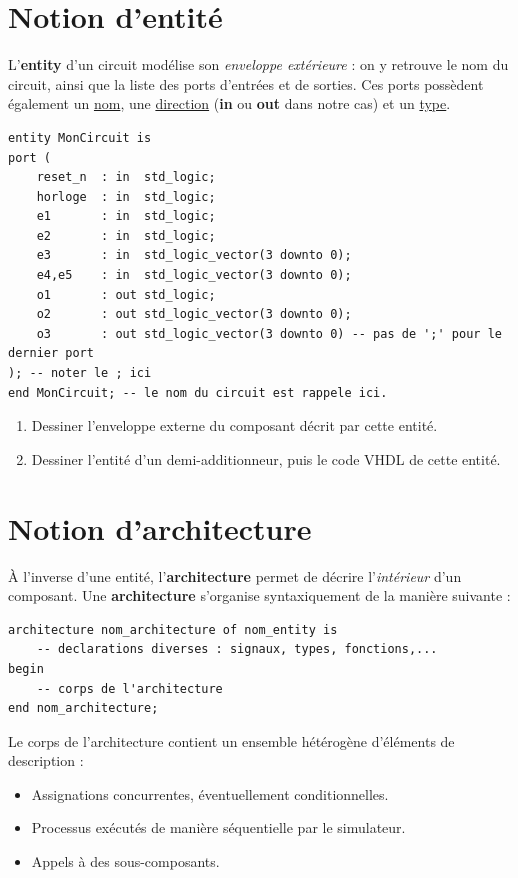 \documentclass[a4paper,11pt]{article}
\begin{document}
\section{Notion d'entité}

L'\textbf{entity} d'un circuit modélise son \textit{enveloppe extérieure} : on y retrouve le nom du circuit, ainsi que la liste des ports d'entrées et de sorties. Ces ports possèdent également un \underline{nom}, une \underline{direction} (\textbf{in} ou \textbf{out} dans notre cas) et un \underline{type}.

\begin{lstlisting}[style=vhdlstyle]
entity MonCircuit is
port (
    reset_n  : in  std_logic;
    horloge  : in  std_logic;
    e1       : in  std_logic;
    e2       : in  std_logic;
    e3       : in  std_logic_vector(3 downto 0);
    e4,e5    : in  std_logic_vector(3 downto 0);
    o1       : out std_logic;
    o2       : out std_logic_vector(3 downto 0);
    o3       : out std_logic_vector(3 downto 0) -- pas de ';' pour le dernier port
); -- noter le ; ici
end MonCircuit; -- le nom du circuit est rappele ici.
\end{lstlisting}

\begin{questionbox}
\begin{enumerate}
    \item Dessiner l'enveloppe externe du composant décrit par cette entité.
    \item Dessiner l'entité d'un demi-additionneur, puis le code VHDL de cette entité.
\end{enumerate}
\end{questionbox}

\section{Notion d'architecture}

À l'inverse d'une entité, l'\textbf{architecture} permet de décrire l'\textit{intérieur} d'un composant. Une \textbf{architecture} s'organise syntaxiquement de la manière suivante :

\begin{lstlisting}[style=vhdlstyle]
architecture nom_architecture of nom_entity is
    -- declarations diverses : signaux, types, fonctions,...
begin
    -- corps de l'architecture
end nom_architecture;
\end{lstlisting}

Le corps de l'architecture contient un ensemble hétérogène d'éléments de description :
\begin{itemize}
    \item Assignations concurrentes, éventuellement conditionnelles.
    \item Processus exécutés de manière séquentielle par le simulateur.
    \item Appels à des sous-composants.
\end{itemize}
\end{document}
